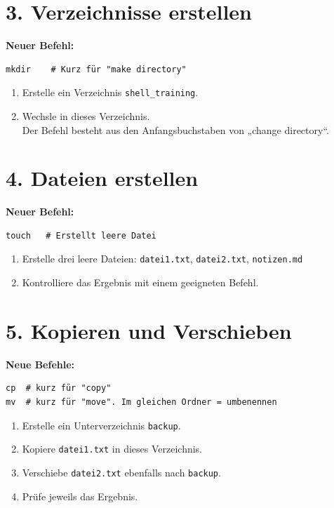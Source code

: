 \documentclass[]{scrreprt}
\begin{document}
\section*{3. Verzeichnisse erstellen}

\textbf{Neuer Befehl:}
\begin{lstlisting}
mkdir    # Kurz für "make directory"
\end{lstlisting}

\begin{enumerate}
  \item Erstelle ein Verzeichnis \texttt{shell\_training}.
  \item Wechsle in dieses Verzeichnis.\\ Der Befehl besteht aus den 
  Anfangsbuchstaben von „change directory“.
\end{enumerate}

\section*{4. Dateien erstellen}

\textbf{Neuer Befehl:}
\begin{lstlisting}
touch   # Erstellt leere Datei
\end{lstlisting}

\begin{enumerate}
  \item Erstelle drei leere Dateien:
  \texttt{datei1.txt}, \texttt{datei2.txt}, \texttt{notizen.md}
  \item Kontrolliere das Ergebnis mit einem geeigneten Befehl.
\end{enumerate}

\section*{5. Kopieren und Verschieben}

\textbf{Neue Befehle:}
\begin{lstlisting}
cp  # kurz für "copy"
mv  # kurz für "move". Im gleichen Ordner = umbenennen 
\end{lstlisting}

\begin{enumerate}
  \item Erstelle ein Unterverzeichnis \texttt{backup}.
  \item Kopiere \texttt{datei1.txt} in dieses Verzeichnis.
  \item Verschiebe \texttt{datei2.txt} ebenfalls nach \texttt{backup}.
  \item Prüfe jeweils das Ergebnis.
\end{enumerate}
\end{document}
